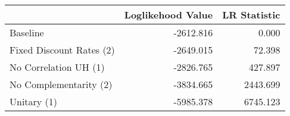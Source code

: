 \begin{tabular}{lrr}
\toprule
{} & Loglikehood Value & LR Statistic \\
\midrule
Baseline                 &         -2612.816 &        0.000 \\
Fixed Discount Rates (2) &         -2649.015 &       72.398 \\
No Correlation UH (1)    &         -2826.765 &      427.897 \\
No Complementarity (2)   &         -3834.665 &     2443.699 \\
Unitary (1)              &         -5985.378 &     6745.123 \\
\bottomrule
\end{tabular}
